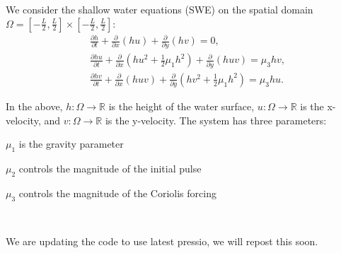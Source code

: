 We consider the shallow water equations (SWE) on the spatial domain $\Omega = [-\frac{L}{2},\frac{L}{2}] \times [-\frac{L}{2},\frac{L}{2}]$\+: \[ \begin{split} &\frac{\partial h}{\partial t} + \frac{\partial}{\partial x }( h u) + \frac{\partial}{\partial y }( h v) = 0,\\ &\frac{\partial h u}{\partial t} + \frac{\partial}{\partial x} (h u^2 + \frac{1}{2} \mu_1 h^2) + \frac{\partial}{\partial y }( h u v) = \mu_3 hv,\\ &\frac{\partial h v}{\partial t} + \frac{\partial}{\partial x} (h u v) + \frac{\partial}{\partial y }( h v^2 + \frac{1}{2} \mu_1 h^2) = \mu_3 hu. \end{split} \]

In the above, $h : \Omega \rightarrow \mathbb{R}$ is the height of the water surface, $u : \Omega \rightarrow \mathbb{R}$ is the x-\/velocity, and $v : \Omega \rightarrow \mathbb{R}$ is the y-\/velocity. The system has three parameters\+:
\begin{DoxyItemize}
\item $\mu_1$ is the gravity parameter
\item $\mu_2$ controls the magnitude of the initial pulse
\item $\mu_3$ controls the magnitude of the Coriolis forcing
\end{DoxyItemize}



~\newline




We are updating the code to use latest pressio, we will repost this soon. 